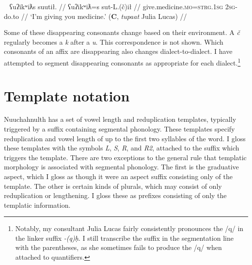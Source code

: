 \ex~ \label{ex:givemedicine}
\begingl
\glpreamble ʕuʔikʷiƛs suutił. //
\gla ʕuʔikʷiƛ\footnotemark=s sut-L.(č)ił //
\glb give.medicine.\textsc{mo}=\textsc{strg.1sg} \textsc{2sg}-do.to //
\glft `I'm giving you medicine.' (\textbf{C}, \textit{tupaat} Julia Lucas) //
\endgl
\xe


Some of these disappearing consonants change based on their environment. A \textit{č} regularly becomes a \textit{k} after a \textit{u}. This correspondence is not shown. Which consonants of an affix are disappearing also changes dialect-to-dialect. I have attempted to segment disappearing consonants as appropriate for each dialect.\footnote{Notably, my consultant Julia Lucas fairly consistently pronounces the /q/ in the linker suffix \textit{-(q)ḥ}. I still transcribe the suffix in the segmentation line with the parentheses, as she sometimes fails to produce the /q/ when attached to quantifiers.}

\section{Template notation}

Nuuchahnulth has a set of vowel length and reduplication templates, typically triggered by a suffix containing segmental phonology. These templates specify reduplication and vowel length of up to the first two syllables of the word. I gloss these templates with the symbols \textit{L}, \textit{S}, \textit{R}, and \textit{R2}, attached to the suffix which triggers the template. There are two exceptions to the general rule that templatic morphology is associated with segmental phonology. The first is the graduative aspect, which I gloss as though it were an aspect suffix consisting only of the template. The other is certain kinds of plurals, which may consist of only reduplication or lengthening. I gloss these as prefixes consisting of only the templatic information.

